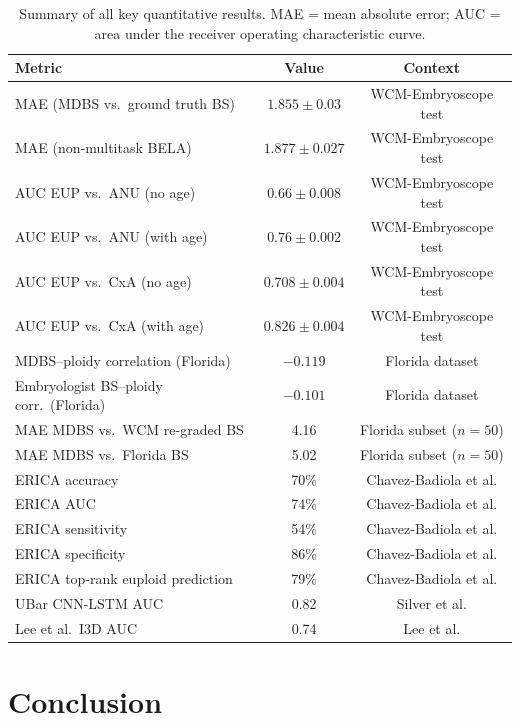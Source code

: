 \documentclass[12pt]{article}
\begin{document}
\begin{table}[H]
\centering
\caption{Summary of all key quantitative results. MAE = mean absolute error; AUC = area under the receiver operating characteristic curve.}
\label{tab:allresults}
\begin{tabular}{p{5.5cm}cc}
\toprule
\textbf{Metric} & \textbf{Value} & \textbf{Context} \\
\midrule
MAE (MDBS vs.\ ground truth BS) & $1.855 \pm 0.03$ & WCM-Embryoscope test \\
MAE (non-multitask BELA) & $1.877 \pm 0.027$ & WCM-Embryoscope test \\
AUC EUP vs.\ ANU (no age) & $0.66 \pm 0.008$ & WCM-Embryoscope test \\
AUC EUP vs.\ ANU (with age) & $0.76 \pm 0.002$ & WCM-Embryoscope test \\
AUC EUP vs.\ CxA (no age) & $0.708 \pm 0.004$ & WCM-Embryoscope test \\
AUC EUP vs.\ CxA (with age) & $0.826 \pm 0.004$ & WCM-Embryoscope test \\
MDBS--ploidy correlation (Florida) & $-0.119$ & Florida dataset \\
Embryologist BS--ploidy corr.\ (Florida) & $-0.101$ & Florida dataset \\
MAE MDBS vs.\ WCM re-graded BS & 4.16 & Florida subset ($n=50$) \\
MAE MDBS vs.\ Florida BS & 5.02 & Florida subset ($n=50$) \\
ERICA accuracy & 70\% & Chavez-Badiola et al. \\
ERICA AUC & 74\% & Chavez-Badiola et al. \\
ERICA sensitivity & 54\% & Chavez-Badiola et al. \\
ERICA specificity & 86\% & Chavez-Badiola et al. \\
ERICA top-rank euploid prediction & 79\% & Chavez-Badiola et al. \\
UBar CNN-LSTM AUC & 0.82 & Silver et al. \\
Lee et al.\ I3D AUC & 0.74 & Lee et al. \\
\bottomrule
\end{tabular}
\end{table}

\section{Conclusion}
\end{document}
